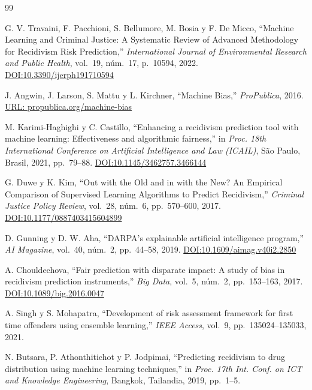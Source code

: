 \documentclass[11pt,a4paper]{article}
\begin{document}
\begin{thebibliography}{99}

G. V. Travaini, F. Pacchioni, S. Bellumore, M. Bosia y F. De Micco,
``Machine Learning and Criminal Justice: A Systematic Review of Advanced Methodology for Recidivism Risk Prediction,''
\textit{International Journal of Environmental Research and Public Health},
vol.~19, núm.~17, p.~10594, 2022.
\href{https://doi.org/10.3390/ijerph191710594}{DOI:10.3390/ijerph191710594}

J. Angwin, J. Larson, S. Mattu y L. Kirchner,
``Machine Bias,''
\textit{ProPublica}, 2016.
\href{https://www.propublica.org/article/machine-bias-risk-assessments-in-criminal-sentencing}{URL: propublica.org/machine-bias}

M. Karimi-Haghighi y C. Castillo,
``Enhancing a recidivism prediction tool with machine learning: Effectiveness and algorithmic fairness,''
in \textit{Proc. 18th International Conference on Artificial Intelligence and Law (ICAIL)},
São Paulo, Brasil, 2021, pp.~79--88.
\href{https://doi.org/10.1145/3462757.3466144}{DOI:10.1145/3462757.3466144}

G. Duwe y K. Kim,
``Out with the Old and in with the New? An Empirical Comparison of Supervised Learning Algorithms to Predict Recidivism,''
\textit{Criminal Justice Policy Review},
vol.~28, núm.~6, pp.~570--600, 2017.
\href{https://doi.org/10.1177/0887403415604899}{DOI:10.1177/0887403415604899}

D. Gunning y D. W. Aha,
``DARPA’s explainable artificial intelligence program,''
\textit{AI Magazine},
vol.~40, núm.~2, pp.~44--58, 2019.
\href{https://doi.org/10.1609/aimag.v40i2.2850}{DOI:10.1609/aimag.v40i2.2850}

A. Chouldechova,
``Fair prediction with disparate impact: A study of bias in recidivism prediction instruments,''
\textit{Big Data},
vol.~5, núm.~2, pp.~153--163, 2017. 
\href{https://doi.org/10.1089/big.2016.0047}{DOI:10.1089/big.2016.0047}

A. Singh y S. Mohapatra,
``Development of risk assessment framework for first time offenders using ensemble learning,''
\textit{IEEE Access},
vol.~9, pp.~135024--135033, 2021.

N. Butsara, P. Athonthitichot y P. Jodpimai,
``Predicting recidivism to drug distribution using machine learning techniques,''
in \textit{Proc. 17th Int. Conf. on ICT and Knowledge Engineering},
Bangkok, Tailandia, 2019, pp.~1--5.


\end{thebibliography}
\end{document}
